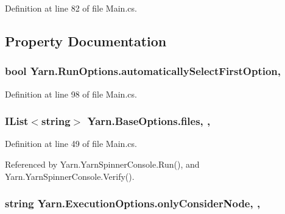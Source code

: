 Definition at line 82 of file Main.\-cs.



\subsection{Property Documentation}
\hypertarget{a00142_ae21d271c37dabee023771a951f6e774e}{
\subsubsection[{automatically\-Select\-First\-Option}]{\setlength{\rightskip}{0pt plus 5cm}bool Yarn.\-Run\-Options.\-automatically\-Select\-First\-Option\hspace{0.3cm}{\ttfamily [get]}, {\ttfamily [set]}}}\label{a00142_ae21d271c37dabee023771a951f6e774e}


Definition at line 98 of file Main.\-cs.

\hypertarget{a00040_aa93cbb1bc1d5328e0a417012621e92d2}{
\subsubsection[{files}]{\setlength{\rightskip}{0pt plus 5cm}I\-List$<$string$>$ Yarn.\-Base\-Options.\-files\hspace{0.3cm}{\ttfamily [get]}, {\ttfamily [set]}, {\ttfamily [inherited]}}}\label{a00040_aa93cbb1bc1d5328e0a417012621e92d2}


Definition at line 49 of file Main.\-cs.



Referenced by Yarn.\-Yarn\-Spinner\-Console.\-Run(), and Yarn.\-Yarn\-Spinner\-Console.\-Verify().

\hypertarget{a00099_af4c0062a1d46281d377f87084fde374e}{
\subsubsection[{only\-Consider\-Node}]{\setlength{\rightskip}{0pt plus 5cm}string Yarn.\-Execution\-Options.\-only\-Consider\-Node\hspace{0.3cm}{\ttfamily [get]}, {\ttfamily [set]}, {\ttfamily [inherited]}}}\label{a00099_af4c0062a1d46281d377f87084fde374e}


